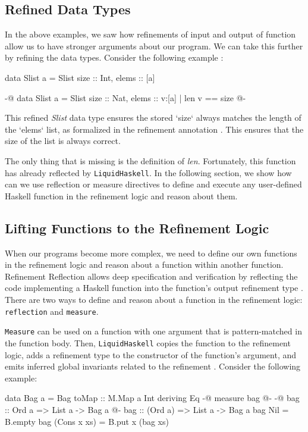 \documentclass[]{rptuseminar}
\begin{document}
\subsection{Refined Data Types}
In the above examples, we saw how refinements of input and output of function allow us to have stronger arguments about our program. 
We can take this further by refining the data types. Consider the following example \cite{jhala_programming_2020}:

\begin{haskell}
  data Slist a = Slist { size :: Int, elems :: [a] }

  {-@ data Slist a = Slist { size :: Nat, elems :: {v:[a] | len v == size} } @-}
\end{haskell}

This refined \textit{Slist} data type ensures the stored `size` always matches the length of the `elems` list, 
as formalized in the refinement annotation \cite{jhala_programming_2020}. 
This ensures that the size of the list is always correct.

The only thing that is missing is the definition of \textit{len}. Fortunately, this function has already reflected by
\texttt{LiquidHaskell}. In the following section, we show how can we use reflection or measure directives to define and execute any user-defined Haskell function in the refinement logic and
reason about them.

\subsection{Lifting Functions to the Refinement Logic}
When our programs become more complex, we need to define our own functions in the refinement logic and reason about
a function within another function. Refinement Reflection allows deep specification and verification by 
reflecting the code implementing a Haskell function into the function’s output refinement type \cite{niki_blog_2016}.
There are two ways to define and reason about a function in the refinement logic: \texttt{reflection} and \texttt{measure}. 

\texttt{Measure} can be used on a function with one argument that is pattern-matched in the function body. Then,
\texttt{LiquidHaskell} copies the function to the refinement logic, adds a refinement type to the constructor of the function's argument, and emits inferred global
invariants related to the refinement \cite{niki_lecture_2024}. Consider the following example:

\begin{haskell}
data Bag a = Bag { toMap :: M.Map a Int } deriving Eq
{-@ measure bag @-}
{-@ bag :: Ord a => List a -> Bag a @-}
bag :: (Ord a) => List a -> Bag a
bag Nil = B.empty
bag (Cons x xs) = B.put x (bag xs)
\end{haskell}
\end{document}
